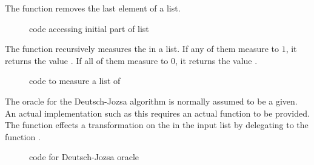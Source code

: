 The  function removes the last element of a list.
\begin{figure}[htbp]

\caption{\lqpl{} code accessing initial part of list}\label{fig:initlist}
\end{figure}

The  function recursively measures the 
\qubits{} in a list. If any of them measure to $1$, it returns the 
value . If all of them measure to $0$, it returns
the value .

\begin{figure}[htbp]

\caption{\lqpl{} code to measure a list of  \qubits}\label{fig:measureinps}
\end{figure}

The oracle for the Deutsch-Jozsa algorithm is normally assumed to be
a given. An actual implementation such as this requires an actual function
to be provided. The function  effects a transformation on
the \qubits{} in the input list by delegating to the function 
.

\begin{figure}[htbp]

\caption{\lqpl{} code for Deutsch-Jozsa oracle}\label{fig:djoracle}
\end{figure}
